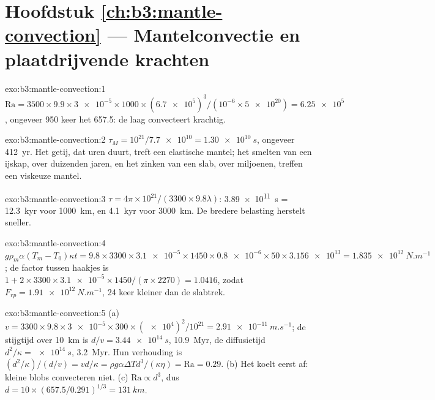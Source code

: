\section*{Hoofdstuk \ref{ch:b3:mantle-convection} --- Mantelconvectie en plaatdrijvende krachten}

\begin{solution}{exo:b3:mantle-convection:1}
$\mathrm{Ra} = 3500\times9.9\times\num{3e-5}\times1000\times(\num{6.7e5})^3/
(10^{-6}\times\num{5e20}) = \num{6.25e5}$, ongeveer 950 keer het  657.5: de laag convecteert krachtig.
\end{solution}

\begin{solution}{exo:b3:mantle-convection:2}
$\tau_M = 10^{21}/\num{7.7e10} = \qty{1.30e10}{s}$, ongeveer \qty{412}{yr}. Het
getij, dat uren duurt, treft een elastische mantel; het smelten van een ijskap,
over duizenden jaren, en het zinken van een slab, over miljoenen, treffen een
viskeuze mantel.
\end{solution}

\begin{solution}{exo:b3:mantle-convection:3}
$\tau = 4\pi\times10^{21}/(3300\times9.8\lambda)$: \qty{3.89e11}{s} =
\qty{12.3}{kyr} voor \qty{1000}{km}, en \qty{4.1}{kyr} voor \qty{3000}{km}. De
bredere belasting herstelt sneller.
\end{solution}

\begin{solution}{exo:b3:mantle-convection:4}
$g\rho_m\alpha(T_m - T_0)\kappa t = 9.8\times3300\times\num{3.1e-5}\times1450
\times\num{0.8e-6}\times50\times\num{3.156e13} = \qty{1.835e12}{N.m^{-1}}$; de
factor tussen haakjes is $1 + 2\times3300\times\num{3.1e-5}\times1450/(\pi\times2270) = 1.0416$,
zodat $F_{rp} = \qty{1.91e12}{N.m^{-1}}$, 24 keer kleiner dan de slabtrek.
\end{solution}

\begin{solution}{exo:b3:mantle-convection:5}
(a) $v = 3300\times9.8\times\num{3e-5}\times300\times(\num{e4})^2/10^{21} =
\qty{2.91e-11}{m.s^{-1}}$; de stijgtijd over \qty{10}{km} is $d/v =
\qty{3.44e14}{s}$, \qty{10.9}{Myr}, de diffusietijd $d^2/\kappa =
\qty{e14}{s}$, \qty{3.2}{Myr}. Hun verhouding is $(d^2/\kappa)/(d/v) =
vd/\kappa = \rho g\alpha\Delta Td^3/(\kappa\eta) = \mathrm{Ra} = 0.29$. (b) Het
koelt eerst af: kleine blobs convecteren niet. (c) $\mathrm{Ra} \propto d^3$, dus $d =
10\times(657.5/0.291)^{1/3} = \qty{131}{km}$.
\end{solution}

